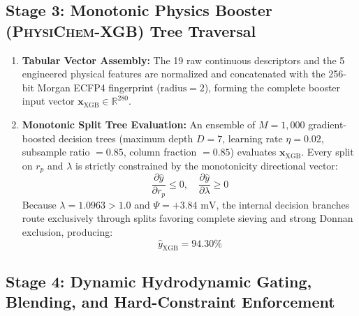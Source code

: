 \documentclass[11pt]{article}
\begin{document}
\subsection{Stage 3: Monotonic Physics Booster (\textsc{PhysiChem-XGB}) Tree Traversal}
\label{sec:walkthrough_xgb}

\begin{enumerate}[leftmargin=1.0cm]
    \item \textbf{Tabular Vector Assembly:} The 19 raw continuous descriptors and the 5 engineered physical features are normalized and concatenated with the 256-bit Morgan ECFP4 fingerprint ($\text{radius} = 2$), forming the complete booster input vector $\mathbf{x}_{\mathrm{XGB}} \in \mathbb{R}^{280}$.
    \item \textbf{Monotonic Split Tree Evaluation:} An ensemble of $M = 1{,}000$ gradient-boosted decision trees (maximum depth $D = 7$, learning rate $\eta = 0.02$, subsample ratio $= 0.85$, column fraction $= 0.85$) evaluates $\mathbf{x}_{\mathrm{XGB}}$. Every split on $r_p$ and $\lambda$ is strictly constrained by the monotonicity directional vector:
    \begin{equation}
    \frac{\partial \hat{y}}{\partial r_p} \le 0, \quad \frac{\partial \hat{y}}{\partial \lambda} \ge 0
    \end{equation}
    Because $\lambda = 1.0963 > 1.0$ and $\Psi = +3.84\text{ mV}$, the internal decision branches route exclusively through splits favoring complete sieving and strong Donnan exclusion, producing:
    \begin{equation}
    \hat{y}_{\mathrm{XGB}} = 94.30\%
    \end{equation}
\end{enumerate}

\subsection{Stage 4: Dynamic Hydrodynamic Gating, Blending, and Hard-Constraint Enforcement}
\label{sec:walkthrough_gating}
\end{document}

